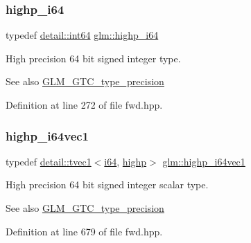 \subsubsection{\texorpdfstring{highp\+\_\+i64}{highp\_i64}}
{\footnotesize\ttfamily typedef \hyperlink{namespaceglm_1_1detail_a5b1c3227ec636c24a0676746381adfc8}{detail\+::int64} \hyperlink{group__gtc__type__precision_gad3cb9a0ac0266ea2c51c6fac256345d1}{glm\+::highp\+\_\+i64}}

High precision 64 bit signed integer type. \begin{DoxySeeAlso}{See also}
\hyperlink{group__gtc__type__precision}{G\+L\+M\+\_\+\+G\+T\+C\+\_\+type\+\_\+precision} 
\end{DoxySeeAlso}


Definition at line 272 of file fwd.\+hpp.

\mbox{\label{group__gtc__type__precision_ga06c21aba992669f5c160ec5f5a480522}} 
\subsubsection{\texorpdfstring{highp\+\_\+i64vec1}{highp\_i64vec1}}
{\footnotesize\ttfamily typedef \hyperlink{structglm_1_1detail_1_1tvec1}{detail\+::tvec1}$<$\hyperlink{group__gtc__type__precision_gac7a7eaad46064fc952b06df33689da23}{i64}, \hyperlink{namespaceglm_a0f04f086094c747d227af4425893f545ac6f7eab42eacbb10d59a58e95e362074}{highp}$>$ \hyperlink{group__gtc__type__precision_ga06c21aba992669f5c160ec5f5a480522}{glm\+::highp\+\_\+i64vec1}}

High precision 64 bit signed integer scalar type. \begin{DoxySeeAlso}{See also}
\hyperlink{group__gtc__type__precision}{G\+L\+M\+\_\+\+G\+T\+C\+\_\+type\+\_\+precision} 
\end{DoxySeeAlso}


Definition at line 679 of file fwd.\+hpp.

\mbox{\label{group__gtc__type__precision_gabfe3aa6fa4003a47577beb9678ab2661}} 
